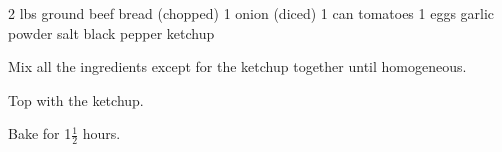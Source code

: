 \dishtype{\main}
\dishother{}
\begin{ingreds}
    2 lbs ground beef
    bread (chopped)
    1 onion (diced)
    1 can tomatoes
    1 eggs
    garlic powder
    salt
    black pepper
    ketchup
\end{ingreds}
\begin{method}
    Mix all the ingredients except for the ketchup together until homogeneous.\par
    Top with the ketchup.\par
    Bake for 1$\frac{1}{2}$ hours.
\end{method}